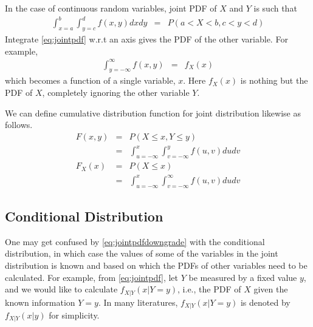 In the case of continuous random variables, joint PDF of $X$ and $Y$ is such that
\begin{eqnarray}
  \int_{x=a}^{b}\int_{y=c}^{d} f(x, y) dxdy &=& P\left(a < X < b, c < y < d \right) \label{eq:jointpdf}
\end{eqnarray}
Integrate \eqref{eq:jointpdf} w.r.t an axis gives the PDF of the other variable. For example,
\begin{eqnarray}
  \int_{y=-\infty}^{\infty} f(x, y) &=& f_X(x) \label{eq:jointpdfdowngrade}
\end{eqnarray}
which becomes a function of a single variable, $x$. Here $f_X(x)$ is nothing but the PDF of $X$, completely ignoring the other variable $Y$.

We can define cumulative distribution function for joint distribution likewise as follows.
\begin{eqnarray}
  F(x, y) &=& P(X \leq x, Y \leq y) \nonumber \\
  &=& \int_{u=-\infty}^{x}\int_{v=-\infty}^{y}f(u, v)dudv \nonumber \\
  F_X(x) &=& P(X \leq x) \nonumber \\
  &=& \int_{u=-\infty}^{x}\int_{v=-\infty}^{\infty}f(u, v)dudv \nonumber
\end{eqnarray}

\subsection{Conditional Distribution}

One may get confused by \eqref{eq:jointpdfdowngrade} with the conditional distribution, in which case the values of some of the variables in the joint distribution is known and based on which the PDFs of other variables need to be calculated. For example, from \eqref{eq:jointpdf}, let $Y$ be measured by a fixed value $y$, and we would like to calculate $f_{X|Y}(x |Y=y)$, i.e., the PDF of $X$ given the known information $Y=y$. In many literatures, $f_{X|Y}(x |Y=y)$ is denoted by $f_{X|Y}(x|y)$ for simplicity.

